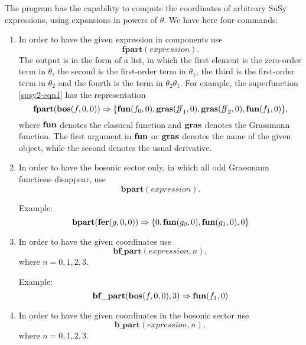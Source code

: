 {The program has the capability to compute the coordinates of arbitrary
SuSy expressions, using expansions in powers of $\theta$.  We have
here four commands:

\begin{enumerate}
\item In order to have the given expression in components use
  \begin{equation*}
    \mathbf{fpart}(\mathit{expression}).
  \end{equation*}
  The output is in the form of a list, in which the first element is
  the zero-order term in $\theta$, the second is the first-order term
  in $\theta_{1}$, the third is the first-order term in $\theta_{2}$
  and the fourth is the term in $\theta_{2}\theta_{1}$.  For example,
  the superfunction \eqref{susy2-eqn1} has the representation
  \begin{equation*}
    \mathbf{fpart}(\mathbf{bos}(f,0,0)) \Rightarrow
    \{ \mathbf{fun}(f_{0},0), \mathbf{gras}(\mathit{ff}_{1},0),
    \mathbf{gras}(\mathit{ff}_{2},0),\mathbf{fun}(f_{1},0) \},
  \end{equation*}
  where $\mathbf{fun}$ denotes the classical function and
  $\mathbf{gras}$ denotes the Grassmann function.  The first argument
  in $\mathbf{fun}$ or $\mathbf{gras}$ denotes the name of the given
  object, while the second denotes the usual derivative.

\item In order to have the bosonic sector only, in which all odd
  Grassmann functions disappear, use
  \begin{equation*}
    \mathbf{bpart}(\mathit{expression}).
  \end{equation*}

  Example:
  \begin{equation*}
    \mathbf{bpart}(\mathbf{fer}(g,0,0)) \Rightarrow
    \{0, \mathbf{fun}(g_{0},0), \mathbf{fun}(g_{1},0), 0\}
  \end{equation*}

\item In order to have the given coordinates use
  \begin{equation*}
    \mathbf{bf\_part}(\mathit{expression},n),
  \end{equation*}
  where $n=0,1,2,3$.

  Example:
  \begin{equation*}
    \mathbf{bf\_part}(\mathbf{bos}(f,0,0),3) \Rightarrow \mathbf{fun}(f_{1},0)
  \end{equation*}

\item In order to have the given coordinates in the bosonic
  sector use
  \begin{equation*}
    \mathbf{b\_part}(\mathit{expression},n),
  \end{equation*}
  where $n=0,1,2,3$.


\end{enumerate}}
